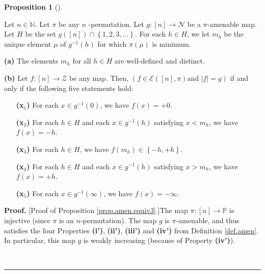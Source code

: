 \documentclass[numbers=enddot,12pt,final,onecolumn,notitlepage]{scrartcl}%
\theoremstyle{definition}
\newtheorem{prop}[theo]{Proposition}
\newenvironment{proposition}[1][]
{\begin{prop}[#1]\begin{leftbar}}
{\end{leftbar}\end{prop}}
\newenvironment{proof}[1][Proof]{\noindent\textbf{#1.} }{\ \rule{0.5em}{0.5em}}
\newenvironment{verlong}{}{}
\begin{document}
\begin{verlong}
\begin{proposition}
\label{prop.amen.equiv3}Let $n\in\mathbb{N}$. Let $\pi$ be any $n$%
-permutation. Let $g:\left[  n\right]  \rightarrow\mathcal{N}$ be a $\pi
$-amenable map. Let $H$ be the set $g\left(  \left[  n\right]  \right)
\cap\left\{  1,2,3,\ldots\right\}  $. For each $h\in H$, we let $m_{h}$ be the
unique element $\mu$ of $g^{-1}\left(  h\right)  $ for which $\pi\left(
\mu\right)  $ is minimum.

\textbf{(a)} The elements $m_{h}$ for all $h\in H$ are well-defined and distinct.

\textbf{(b)} Let $f:\left[  n\right]  \rightarrow\mathcal{Z}$ be any map.
Then, $\left(  f\in\mathcal{E}\left(  \left[  n\right]  ,\pi\right)  \text{
and }\left\vert f\right\vert =g\right)  $ if and only if the following five
statements hold:

\begin{enumerate}
\item[\textbf{(x}$_{1}$\textbf{)}] For each $x\in g^{-1}\left(  0\right)  $,
we have $f\left(  x\right)  =+0$.

\item[\textbf{(x}$_{2}$\textbf{)}] For each $h\in H$ and each $x\in
g^{-1}\left(  h\right)  $ satisfying $x<m_{h}$, we have $f\left(  x\right)
=-h$.

\item[\textbf{(x}$_{3}$\textbf{)}] For each $h\in H$, we have $f\left(
m_{h}\right)  \in\left\{  -h,+h\right\}  $.

\item[\textbf{(x}$_{4}$\textbf{)}] For each $h\in H$ and each $x\in
g^{-1}\left(  h\right)  $ satisfying $x>m_{h}$, we have $f\left(  x\right)
=+h$.

\item[\textbf{(x}$_{5}$\textbf{)}] For each $x\in g^{-1}\left(  \infty\right)
$, we have $f\left(  x\right)  =-\infty$.
\end{enumerate}
\end{proposition}

\begin{proof}
[Proof of Proposition \ref{prop.amen.equiv3}.]The map $\pi:\left[  n\right]
\rightarrow\mathbb{P}$ is injective (since $\pi$ is an $n$-permutation). The
map $g$ is $\pi$-amenable, and thus satisfies the four Properties
\textbf{(i')}, \textbf{(ii')}, \textbf{(iii')} and \textbf{(iv')} from
Definition \ref{def.amen}. In particular, this map $g$ is weakly increasing
(because of Property \textbf{(iv')}).


\end{proof}
\end{verlong}
\end{document}
